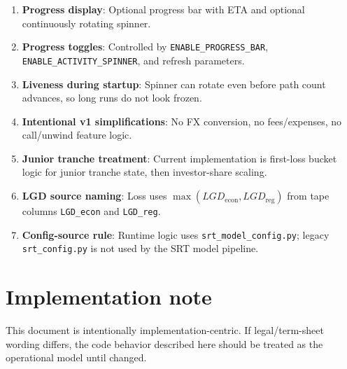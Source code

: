 \documentclass[11pt]{article}
\begin{document}
\begin{enumerate}[label=\arabic*),leftmargin=*,align=left]
\item \textbf{Progress display}: Optional progress bar with ETA and optional continuously rotating spinner.
\item \textbf{Progress toggles}: Controlled by \texttt{ENABLE\_PROGRESS\_BAR}, \texttt{ENABLE\_ACTIVITY\_SPINNER}, and refresh parameters.
\item \textbf{Liveness during startup}: Spinner can rotate even before path count advances, so long runs do not look frozen.

\item \textbf{Intentional v1 simplifications}: No FX conversion, no fees/expenses, no call/unwind feature logic.
\item \textbf{Junior tranche treatment}: Current implementation is first-loss bucket logic for junior tranche state, then investor-share scaling.
\item \textbf{LGD source naming}: Loss uses \(\max(LGD_{\text{econ}},LGD_{\text{reg}})\) from tape columns \texttt{LGD\_econ} and \texttt{LGD\_reg}.
\item \textbf{Config-source rule}: Runtime logic uses \texttt{srt\_model\_config.py}; legacy \texttt{srt\_config.py} is not used by the SRT model pipeline.

\end{enumerate}

\section*{Implementation note}
This document is intentionally implementation-centric. If legal/term-sheet wording differs, the code behavior described here should be treated as the operational model until changed.
\end{document}
